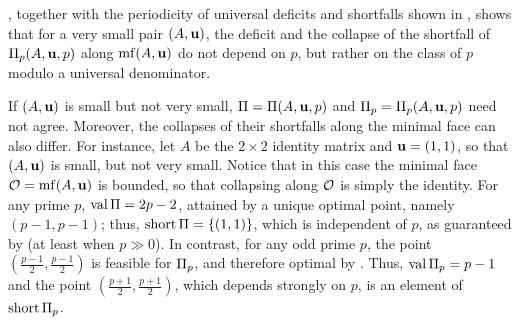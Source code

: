 \documentclass{amsart}
\begin{document}

\begin{remark} \label{program behavior small: R}
   , together with the periodicity of universal deficits and shortfalls shown in , shows that for a very small pair $(A,\mathbf{u})$, the deficit and the collapse of the shortfall of  $\Pi_p(A,\mathbf{u},p)$ along $\operatorname{mf}(A, \mathbf{u})$ do not depend on $p$,  but rather on the class of $p$ modulo a universal denominator.
\end{remark}

\begin{example}
   If $(A, \mathbf{u})$ is small but not very small, $\Pi = \Pi(A,\mathbf{u},p)$ and $\Pi_p = \Pi_p(A,\mathbf{u},p)$ need not agree.
   Moreover, the collapses of their shortfalls along the minimal face can also differ.
   For instance, let $A$ be the $2 \times 2$ identity matrix and $\mathbf{u} = (1,1)$, so that $(A,\mathbf{u})$ is small, but not very small.
   Notice that in this case the minimal face $\mathcal{O} = \operatorname{mf}(A,\mathbf{u})$ is bounded, so that collapsing along $\mathcal{O}$ is simply the identity.
   For any prime $p$, $\operatorname{val} \Pi = 2p - 2$, attained by a unique optimal point, namely $(p-1,p-1)$; thus, $\operatorname{short} \Pi = \{(1,1)\}$, which is independent of $p$, as guaranteed by   (at least when $p \gg 0$).
   In contrast, for any odd prime $p$, the point $(\frac{p-1}{2}, \frac{p-1}{2})$ is feasible for $\Pi_p$, and therefore optimal by .
   Thus, $\operatorname{val} \Pi_p = p-1$ and the point $(\frac{p+1}{2}, \frac{p+1}{2})$, which depends strongly on $p$, is an element of $\operatorname{short} \Pi_p$.
\end{example}
\end{document}
